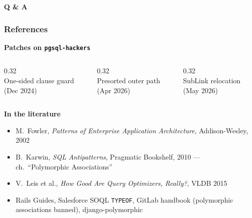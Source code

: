 \documentclass{beamer}
\begin{document}

{
\begin{frame}[plain]
\vspace*{\fill}
\begin{center}
{\Huge\bfseries\color{pgblue!85!black} Q \& A}
\end{center}
\vspace*{\fill}
\end{frame}
}


\begin{frame}\frametitle{References}
\vspace{-2mm}
\begin{center}
{\small\bfseries Patches on \texttt{pgsql-hackers}}
\end{center}

\begin{columns}[T]
\begin{column}{0.32\textwidth}
\centering
{}\\[1mm]
{\scriptsize One-sided clause guard\\(Dec 2024)}
\end{column}
\begin{column}{0.32\textwidth}
\centering
{}\\[1mm]
{\scriptsize Presorted outer path\\(Apr 2026)}
\end{column}
\begin{column}{0.32\textwidth}
\centering
{}\\[1mm]
{\scriptsize SubLink relocation\\(May 2026)}
\end{column}
\end{columns}

\vspace{3mm}
{\small\bfseries In the literature}
\begin{itemize}\scriptsize
  \item M.~Fowler, \textit{Patterns of Enterprise Application
        Architecture}, Addison-Wesley, 2002
  \item B.~Karwin, \textit{SQL Antipatterns}, Pragmatic Bookshelf,
        2010 --- ch.\ ``Polymorphic Associations''
  \item V.~Leis et al., \textit{How Good Are Query Optimizers,
        Really?}, VLDB 2015
  \item Rails Guides, Salesforce SOQL \texttt{TYPEOF},
        GitLab handbook (polymorphic associations banned),
        django-polymorphic
\end{itemize}
\end{frame}
\end{document}
